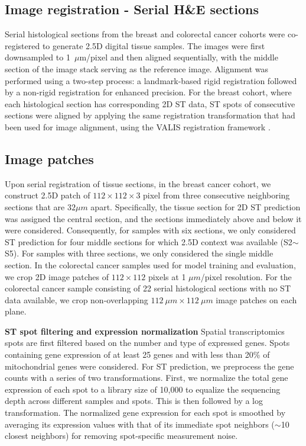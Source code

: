 
\subsection{Image registration - Serial H\&E sections}
Serial histological sections from the breast and colorectal cancer cohorts were co-registered to generate 2.5D digital tissue samples. The images were 
first downsampled to 1~$\mu$m/pixel and then aligned sequentially, with the middle section of the image stack serving as the reference image. Alignment was performed using a two-step process: a landmark-based rigid registration followed by a non-rigid registration for enhanced precision.  For the breast cohort, where each histological section has corresponding 2D ST data, ST spots of consecutive sections were aligned by applying the same registration transformation that had been used for image alignment, using the VALIS registration framework \cite{gatenbee2023virtual}.

\subsection{Image patches}
Upon serial registration of tissue sections, in the breast cancer cohort, we construct 2.5D patch of $112\times 112\times 3$ pixel from three consecutive neighboring sections that are $32\mu m$ apart. Specifically, the tissue section for 2D ST prediction was assigned the central section, and the sections immediately above and below it were considered. Consequently, for samples with six sections, we only considered ST prediction for four middle sections for which 2.5D context was available (S2$\sim$S5). For samples with three sections, we only considered the single middle section. In the colorectal cancer samples used for model training and evaluation, we crop
2D image patches of $112\times 112$ pixels at 1 $\mu m$/pixel resolution. For the colorectal cancer sample consisting of 22 serial histological sections with no ST data available, we crop non-overlapping $112~\mu m\times112~\mu m$ image patches on each plane.



\noindent\textbf{ST spot filtering and expression normalization} Spatial transcriptomics spots are first filtered based on the number and type of expressed genes. Spots containing gene expression of at least 25 genes and with less than 20\% of mitochondrial genes were considered. For ST prediction, we preprocess the gene counts with a series of two transformations. First, we normalize the total gene expression of each spot to a library size of 10,000 to equalize the sequencing depth across different samples and spots. This is then followed by a log transformation. The normalized gene expression for each spot is smoothed by averaging its expression values with that of its immediate spot neighbors ($\sim$10 closest neighbors) for removing spot-specific measurement noise\cite{he2020integrating, chung2024accurate, zhang2024inferring}.


